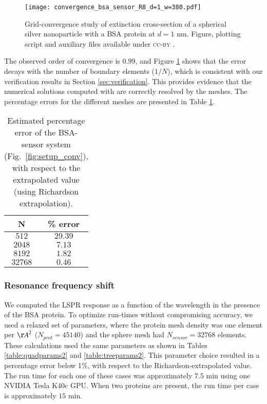 \begin{figure}[h] %
   \centering
   \texttt{[image: convergence\_bsa\_sensor\_R8\_d=1\_w=380.pdf]} 
   \caption{Grid-convergence study of extinction cross-section of a spherical silver
            nanoparticle with a BSA protein at $d=1$ nm. Figure, plotting script and auxiliary files available under \textsc{cc-by} \cite{ClementiETal2018c}.}
   \label{fig:error_sphere-bsa}
\end{figure}

The observed order of convergence is $0.99$, and 
Figure \ref{fig:error_sphere-bsa} shows that the error decays with the number
of boundary elements ($1/N$), which is consistent with our verification 
results in Section \ref{sec:verification}. This provides evidence that the
numerical solutions computed with \pygbe are correctly resolved by the meshes.
The percentage errors for the different meshes are presented in Table \ref{table:err_bsa_sensor}.

\begin{table}%
    \centering
    \caption{\label{table:err_bsa_sensor} Estimated percentage error of the BSA-sensor system (Fig.~\ref{fig:setup_conv}), with respect to the extrapolated value (using Richardson extrapolation).} 
    \begin{tabular}{c c}
    \hline%
    N & \% error \\
    \hline%
     $512$ & $29.39$ \\
     $2048$ & $7.13$ \\
     $8192$ & $1.82$ \\
     $32768$ & $0.46$ \\
    \hline%
    \end{tabular}
\end{table}

\subsubsection{Resonance frequency shift} \label{sec:bsa_shift}

We computed the LSPR response as a function of the wavelength in the presence 
of the BSA protein. To optimize run-times without compromising accuracy, we used a relaxed
set of parameters, where the protein mesh density was one element per
${\AA}^2$ ($N_{prot}=45140$) and the sphere mesh had $N_{sensor}=32768$ elements. 
These calculations used the same parameters as shown in Tables \ref{table:quadparams2} and \ref{table:treeparams2}.
This parameter choice resulted in a percentage error below 1\%, with respect to the Richardson-extrapolated value.
The run time for each one of these cases was approximately $7.5$ min using one NVIDIA Tesla K40c GPU. 
When two proteins are present, the run time per case is approximately  $15$ min. 

